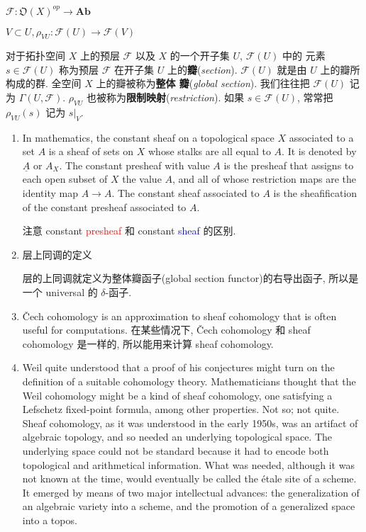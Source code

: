 \documentclass[UTF8]{ctexart}
\newcommand{\F}{\mathscr{F}}
\newcommand{\NBR}[1]{\mathfrak{O}(#1)}
\newcommand{\Cech}{Čech }
\begin{document}
$\F \colon \NBR{X}^{op} \to \mathbf{A\!b}$

$V \subset U, \rho_{VU} : \F(U) \to \F(V)$

对于拓扑空间 $X$ 上的预层 $\F$ 以及 $X$ 的一个开子集 $U$, $\F(U)$ 中的
元素 $s \in \F(U)$ 称为预层 $\F$ 在开子集 $U$ 上的\textbf{瓣}(\textit{section}). $\F(U)$
就是由 $U$ 上的瓣所构成的群. 全空间 $X$ 上的瓣被称为\textbf{整体
  瓣}(\textit{global section}). 我们往往把 $\F(U)$ 记为 $\Gamma(U,
\F)$. $\rho_{VU}$ 也被称为\textbf{限制映射}(\textit{restriction}). 如果 $s \in
\F(U)$, 常常把 $\rho_{VU}(s)$ 记为 $s|_{V}$.

\begin{enumerate}
\item In mathematics, the constant sheaf on a topological space $X$ associated to a set $A$ is a sheaf of sets on $X$ whose stalks are all equal to $A$. It is denoted by $\underline{A}$ or $A_X$. The constant presheaf with value $A$ is the presheaf that assigns to each open subset of $X$ the value $A$, and all of whose restriction maps are the identity map $A\to A$. The constant sheaf associated to $A$ is the sheafification of the constant presheaf associated to $A$.\cite{constant_sheaf}

    注意 constant \textcolor{red}{presheaf} 和 constant \textcolor{blue}{sheaf} 的区别.

\item 层上同调的定义

层的上同调就定义为整体瓣函子(global section functor)的右导出函子, 所以是一个 universal 的 $\delta$-函子.

\item \Cech  cohomology is an approximation to sheaf cohomology that is often useful for computations. 在某些情况下, \Cech cohomology 和 sheaf cohomology 是一样的, 所以能用来计算 sheaf cohomology.

\item \cite{tohoku}Weil quite understood that a proof of his conjectures might turn on the definition of a suitable cohomology theory. Mathematicians thought that the Weil cohomology might be a kind of sheaf cohomology, one satisfying a Lefschetz fixed-point formula, among other properties. Not so; not quite. Sheaf cohomology, as it was understood in the early 1950s, was an artifact of algebraic topology, and so needed an underlying topological space. The underlying space could not be standard because it had to encode both topological and arithmetical information. What was needed, although it was not known at the time, would eventually be called the étale site of a scheme. It emerged by means of two major intellectual advances: the generalization of an algebraic variety into a scheme, and the promotion of a generalized space into a topos.


\end{enumerate}
\end{document}

